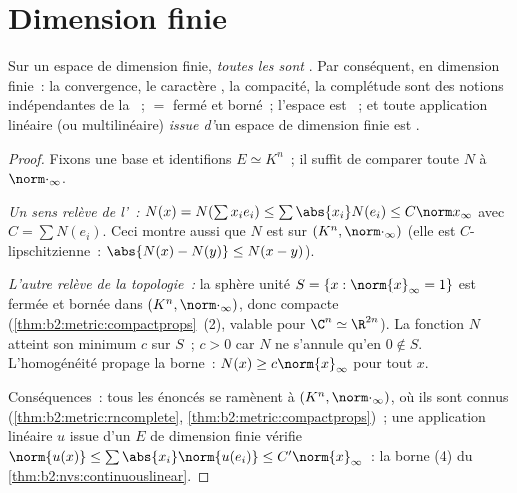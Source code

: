\section{Dimension finie}

\begin{theorem}\label{thm:b2:nvs:finitedim}
Sur un espace de dimension finie, \emph{toutes les  sont
}. Par conséquent, en
dimension finie~: la convergence, le caractère , la compacité, la
complétude sont des notions indépendantes de la ~;  $=$
fermé et borné~; l'espace est ~; et toute application linéaire
(ou multilinéaire) \emph{issue d'}un espace de dimension finie est
.
\end{theorem}

\begin{proof}
Fixons une base et identifions $E \simeq K^n$~; il suffit de comparer
toute  $N$ à $\norm\cdot_\infty$.

\emph{Un sens relève de l'~:} $N(x) = N(\sum x_i e_i) \leq
\sum \abs{x_i} N(e_i) \leq C \norm x_\infty$ avec $C = \sum N(e_i)$.
Ceci montre aussi que $N$ est  sur $(K^n, \norm\cdot_\infty)$
(elle est $C$-lipschitzienne~: $\abs{N(x) - N(y)} \leq N(x - y)$).

\emph{L'autre relève de la topologie~:} la sphère unité $S = \{x :
\norm{x}_\infty = 1\}$ est fermée et bornée dans $(K^n,
\norm\cdot_\infty)$, donc compacte
(\cref{thm:b2:metric:compactprops}~(2), valable pour $\C^n \simeq
\R^{2n}$). La fonction  $N$ atteint son minimum $c$ sur
$S$~; $c > 0$ car $N$ ne s'annule qu'en $0 \notin S$. L'homogénéité
propage la borne~: $N(x) \geq c \norm{x}_\infty$ pour tout $x$.

Conséquences~: tous les énoncés se ramènent à $(K^n,
\norm\cdot_\infty)$, où ils sont connus
(\cref{thm:b2:metric:rncomplete},
\cref{thm:b2:metric:compactprops})~; une application linéaire $u$
issue d'un $E$ de dimension finie vérifie $\norm{u(x)} \leq \sum\abs{x_i}
\norm{u(e_i)} \leq C'\norm{x}_\infty$~: la borne (4) du
\cref{thm:b2:nvs:continuouslinear}.
\end{proof}

